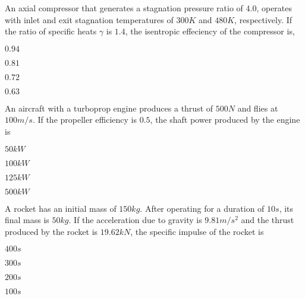         \item An axial compressor that generates a stagnation pressure ratio of $4.0$, operates with inlet and exit stagnation temperatures of $300 K$ and $480 K$, respectively. If the ratio of specific heats $\gamma$ is $1.4$, the isentropic effeciency of the compressor is,
            \begin{enumerate}
                    \begin{multicols}{2}
                    \item $0.94$
                        \columnbreak
                    \item $0.81$
                    \end{multicols}
                    \begin{multicols}{2}
                    \item $0.72$
                        \columnbreak
                    \item $0.63$
                    \end{multicols}
            \end{enumerate}
        \item An aircraft with a turboprop engine produces a thrust of $500 N$ and flies at $100 m/s$. If the propeller efficiency is $0.5$, the shaft power produced by the engine is 
            \begin{enumerate}
                    \begin{multicols}{2}
                    \item $50kW$
                        \columnbreak
                    \item $100kW$ 
                    \end{multicols}
                    \begin{multicols}{2}
                    \item $125kW$
                        \columnbreak
                    \item $500kW$
                    \end{multicols}
            \end{enumerate}
        \item A rocket has an initial mass of $150 kg$. After operating for a duration of $10 s$, its final mass is $50 kg$. If the acceleration due to gravity is $9.81 m/s^2$ and the thrust produced by the rocket is $19.62 kN$, the specific impulse of the rocket is
            \begin{enumerate}
                    \begin{multicols}{2}
                    \item $400s$
                        \columnbreak
                    \item $300s$
                    \end{multicols}
                    \begin{multicols}{2}
                    \item $200s$
                        \columnbreak
                    \item $100s$
                    \end{multicols}
            \end{enumerate}
